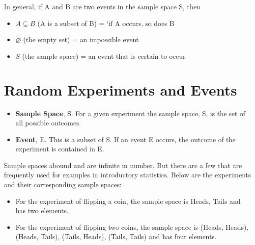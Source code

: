 \documentclass[]{report}
\begin{document}
In general, if A and B are two events in the sample space S, then
\begin{itemize} 
\item $A \subseteq B$ (A is a subset of B) = `if A occurs, so does B
\item $\varnothing$ (the empty set) = an impossible event
\item $S$ (the sample space) = an event that is certain to occur
\end{itemize}



\section{Random Experiments and  Events}

\begin{itemize}
\item \textbf{Sample Space}, S. For a given experiment the sample space, S, is the set of all
possible outcomes.
\item \textbf{Event}, E. This is a subset of S. If an event E occurs, the outcome of the experiment is contained in E.
\end{itemize}




Sample spaces abound and are infinite in number. But there are a few that are frequently used for examples in introductory statistics. Below are the experiments and their corresponding sample spaces:

\begin{itemize}
\item For the experiment of flipping a coin, the sample space is {Heads, Tails} and has two elements.

\item For the experiment of flipping two coins, the sample space is {(Heads, Heads), (Heads, Tails), (Tails, Heads), (Tails, Tails) } and has four elements.
\end{itemize}
\end{document}
